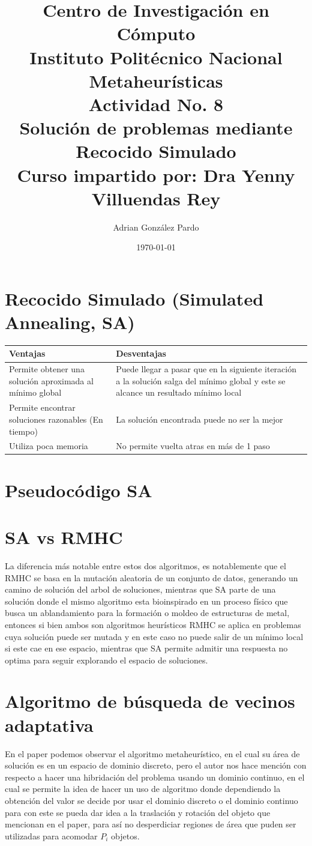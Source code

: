 \documentclass[10pt]{article}
\title{Centro de Investigación en Cómputo\\Instituto Politécnico Nacional\\Metaheurísticas\\Actividad No. 8\\ Solución de problemas mediante Recocido Simulado\\Curso impartido por: Dra Yenny Villuendas Rey}
\author{Adrian González Pardo}
\date{\today}
\begin{document}
\maketitle
\section{Recocido Simulado (Simulated Annealing, SA)}
\begin{center}
  \begin{tabular}{|p{6cm}|p{6cm}|}
    \hline
    Ventajas & Desventajas \\
    \hline
    Permite obtener una solución aproximada al mínimo global & Puede llegar a pasar que en la siguiente iteración a la solución salga del mínimo global y este se alcance un resultado mínimo local \\
    \hline
    Permite encontrar soluciones razonables (En tiempo) & La solución encontrada puede no ser la mejor\\
    \hline
    Utiliza poca memoria & No permite vuelta atras en más de 1 paso\\
    \hline
  \end{tabular}
\end{center}
\section{Pseudocódigo SA}

\section{SA vs RMHC}
La diferencia más notable entre estos dos algoritmos, es notablemente que el RMHC se basa en la mutación aleatoria de un conjunto de datos, generando un camino de solución del arbol de soluciones, mientras que SA parte de una solución donde el mismo algoritmo esta bioinspirado en un proceso físico que busca un ablandamiento para la formación o moldeo de estructuras de metal, entonces si bien ambos son algoritmos heurísticos RMHC se aplica en problemas cuya solución puede ser mutada y en este caso no puede salir de un mínimo local si este cae en ese espacio, mientras que SA permite admitir una respuesta no optima para seguir explorando el espacio de soluciones.
\section{Algoritmo de búsqueda de vecinos adaptativa}
En el paper podemos observar el algoritmo metaheurístico, en el cual su área de solución es en un espacio de dominio discreto, pero el autor nos hace mención con respecto a hacer una hibridación del problema usando un dominio continuo, en el cual se permite la idea de hacer un uso de algoritmo donde dependiendo la obtención del valor se decide por usar el dominio discreto o el dominio continuo para con este se pueda dar idea a la traslación y rotación del objeto que mencionan en el paper, para así no desperdiciar regiones de área que puden ser utilizadas para acomodar $P_{i}$ objetos.
\end{document}
